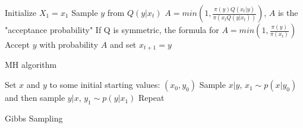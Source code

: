 \documentclass[../main.tex]{subfiles}
\begin{document}
\begin{algorithm}[H]
    \SetAlgoLined
    Initialize $X_{1} = x_{1}$\;
     {
      Sample $y$ from $Q(y|x_{t})$\;
      $A = min(1, \frac{\pi(y)Q(x_{t}|y)}{\pi(x_{t}Q(y|x_{t}))})$, $A$ is the "acceptance probability"\;
      If Q is symmetric, the formula for $A = min(1, \frac{\pi(y)}{\pi(x_{t})})$\;
      Accept $y$ with probability $A$ and set $x_{t+1} = y$
    }
    \caption{MH algorithm}
\end{algorithm}
\begin{algorithm}[H]
    \SetAlgoLined
    Set $x$ and $y$ to some initial starting values: $(x_{0}, y_{0})$\;
    Sample $x|y$, $x_{1} \sim p(x|y_{0})$ and then sample $y|x$, $y_{1} \sim p(y|x_{1})$\;
    Repeat\;
    \caption{Gibbs Sampling}
\end{algorithm}
\end{document}
